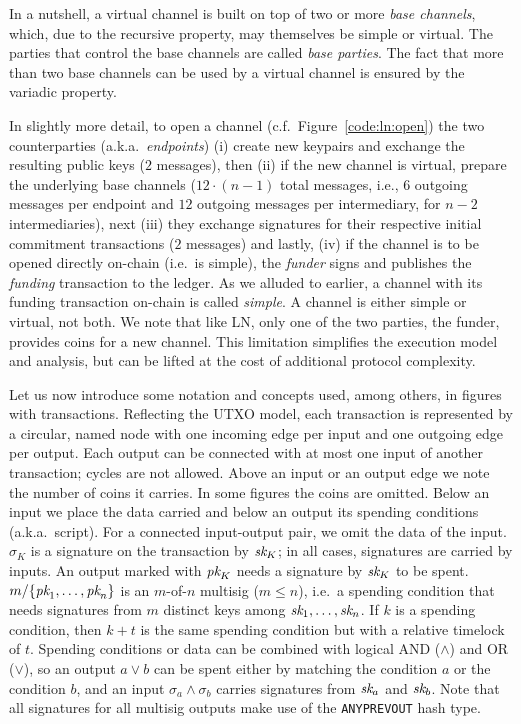   In a nutshell, a virtual channel is built on top of two or more \emph{base
  channels}, which, due to the recursive property, may themselves be simple or
  virtual. The parties that control the base channels are called \emph{base
  parties}. The fact that more than two base channels can be used by a
  virtual channel is ensured by the variadic property.

  In slightly more detail, to open a channel (c.f.\ Figure~\ref{code:ln:open})
  the two counterparties (a.k.a.\ \emph{endpoints}) (i) create new keypairs and
  exchange the resulting public keys ($2$ messages), then (ii) if the new
  channel is virtual, prepare the underlying base channels ($12 \cdot (n-1)$
  total messages,
  i.e., $6$ outgoing messages per endpoint and $12$ outgoing messages per
  intermediary, for $n-2$ intermediaries), next (iii) they exchange signatures
  for their respective initial commitment transactions ($2$ messages) and
  lastly, (iv) if the channel is to be opened directly on-chain (i.e.\ is
  simple), the \emph{funder} signs and publishes the \emph{funding} transaction to the
  ledger. As we alluded to earlier, a channel with its funding transaction
  on-chain is called \emph{simple}. A channel is either simple or virtual, not
  both. We note that like LN, only one of the two parties, the funder,
  provides coins for a new channel. This limitation simplifies the execution
  model and analysis, but can be lifted at the cost of additional protocol
  complexity.

  Let us now introduce some notation and concepts used, among others, in figures
  with transactions.
  Reflecting the UTXO model, each transaction is represented by a circular,
  named node with one incoming edge per input and one outgoing edge per output.
  Each output can be connected with at most one input of another transaction;
  cycles are not allowed. Above an input or an output edge we note the number of
  coins it carries. In some figures the coins are omitted. Below an input we
  place the data carried and below an output its spending conditions (a.k.a.\
  script). For
  a connected input-output pair, we omit the data of the input.
  $\sigma_K$ is a signature on the transaction by $\textit{sk}_{K}$; in all cases, signatures
  are carried by inputs. An output marked
  with $\textit{pk}_{K}$ needs a signature by $\textit{sk}_{K}$ to be spent. $m/\{\textit{pk}_{1}, \dots,
  \textit{pk}_{n}\}$ is an $m$-of-$n$ multisig ($m \leq n$), i.e.\ a spending condition that needs signatures from
  $m$ distinct keys among $\textit{sk}_{1}, \dots, \textit{sk}_{n}$. If $k$ is a spending
  condition, then $k + t$ is the same spending condition but with a relative timelock
  of $t$. Spending conditions or data can be combined with logical AND
  ($\wedge$) and OR ($\vee$), so an output $a \vee b$ can be spent either by
  matching the condition $a$ or the condition $b$, and an input $\sigma_a \wedge
  \sigma_b$ carries signatures from $\textit{sk}_{a}$ and $\textit{sk}_{b}$.
  Note that all signatures for all multisig outputs make use of the
  \texttt{ANYPREVOUT} hash type.

